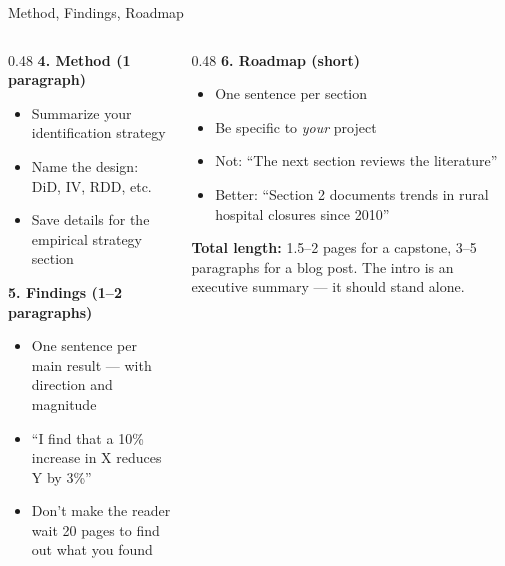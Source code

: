 \begin{frame}{Method, Findings, Roadmap}
  \footnotesize
  \begin{columns}[T]
    \begin{column}{0.48\textwidth}
      \textbf{\textcolor{usfgreen}{4. Method (1 paragraph)}}
      \begin{itemize}\setlength\itemsep{0pt}
        \item Summarize your identification strategy
        \item Name the design: DiD, IV, RDD, etc.
        \item Save details for the empirical strategy section
      \end{itemize}

      \vspace{4pt}

      \textbf{\textcolor{usfgreen}{5. Findings (1--2 paragraphs)}}
      \begin{itemize}\setlength\itemsep{0pt}
        \item One sentence per main result --- with direction and magnitude
        \item ``I find that a 10\% increase in X reduces Y by 3\%''
        \item Don't make the reader wait 20 pages to find out what you found
      \end{itemize}
    \end{column}
    \begin{column}{0.48\textwidth}
      \textbf{\textcolor{usfgreen}{6. Roadmap (short)}}
      \begin{itemize}\setlength\itemsep{0pt}
        \item One sentence per section
        \item Be specific to \emph{your} project
        \item Not: ``The next section reviews the literature''
        \item Better: ``Section 2 documents trends in rural hospital closures since 2010''
      \end{itemize}

      \vspace{4pt}

      \textbf{Total length:} 1.5--2 pages for a capstone, 3--5 paragraphs for a blog post. The intro is an executive summary --- it should stand alone.
    \end{column}
  \end{columns}
\end{frame}

